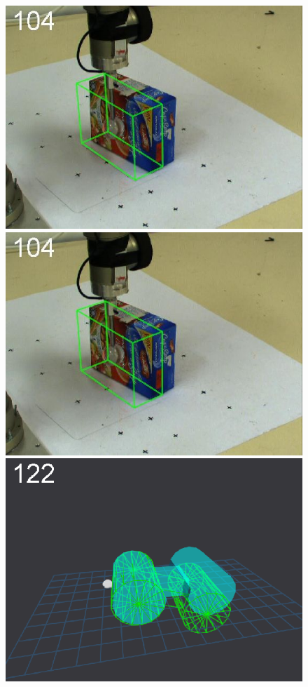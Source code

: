 \begin{figure}[tbp]
{\includegraphics[width=\imgCXwid]{images/C1_1exp_87_2}
\includegraphics[width=\imgCXwid]{images/C1_LWPR1_87_2}
\includegraphics[width=\imgCXwid]{images/C5_1exp_6_2}
}
\end{figure}
